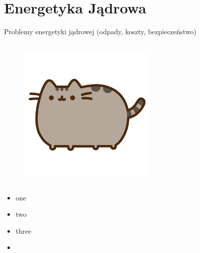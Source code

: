 \section{Energetyka Jądrowa}

\begin{columnframe}{Problemy energetyki jądrowej (odpady, koszty, bezpieczeństwo)}
    \begin{column}{0.5\textwidth}
        \begin{figure}
            \centering
            \includegraphics[width=0.6\textwidth, frame]{images/pusheen.png}
        \end{figure}
    \end{column}
    \begin{column}{0.5\textwidth}
        \begin{itemize}
            \item one \keV
            \item two \MeV
            \item three \GeV
            \item \aegis
        \end{itemize}
    \end{column}
\end{columnframe}


